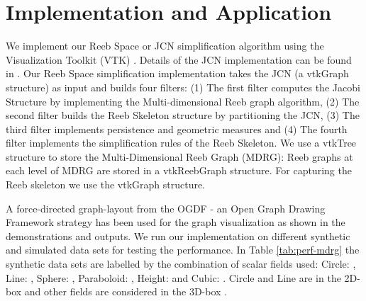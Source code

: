 \documentclass[twocolumn]{article}
\newcommand{\tabref}[1]{Table \ref{tab:#1}}
\begin{document}
%
 

\section{Implementation and Application}
\label{sec:Implementation}

We implement our Reeb Space or JCN simplification algorithm using the Visualization Toolkit (VTK)
\cite{vtk}. Details of the JCN implementation can be found in \cite{2013-Carr-TVCG,
  2012-Duke-VisWeek}. Our Reeb Space simplification implementation takes the JCN (a vtkGraph
structure) as input and builds four filters: (1) The first filter computes the
Jacobi Structure by implementing the Multi-dimensional Reeb graph
algorithm, (2) The second filter builds the Reeb Skeleton structure by
partitioning the JCN, (3) The third filter implements persistence and geometric measures and (4) The fourth filter implements the
simplification rules of the Reeb Skeleton.
We use a vtkTree structure to store the Multi-Dimensional Reeb Graph (MDRG): 
Reeb graphs at each level of MDRG are stored in a vtkReebGraph structure. For capturing 
the Reeb skeleton we use the vtkGraph structure. 

\begin{table}[h!]
 \begin{centering}
 \caption{Data Statistics}
\label{tab:perf-mdrg}
\end{centering}
\end{table}
A force-directed graph-layout from the OGDF - an Open Graph Drawing
Framework \cite{ogdf} strategy has been used for the graph
visualization as shown in the demonstrations and outputs.
We run our implementation on different synthetic and simulated data sets for
testing the performance.  In \tabref{perf-mdrg} the synthetic data sets are 
labelled by the combination of scalar fields used: Circle: , Line: , 
Sphere: , Paraboloid: , Height:  and Cubic: . Circle and Line are in the 2D-box  and other fields are
  considered in the 3D-box . 
\end{document}
